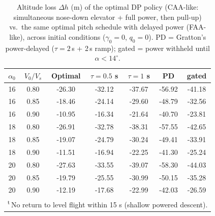 \begin{table}[hbt!]
    \centering
    \caption{Altitude loss $\Delta h$ (m) of the optimal DP policy (CAA-like:
    simultaneous nose-down elevator + full power, then pull-up) vs.\ the same
    optimal pitch schedule with delayed power (FAA-like), across initial
    conditions ($\gamma_0=0$, $q_0=0$). PD = Gratton's power-delayed
    ($\tau=2$\,s + 2\,s ramp); gated = power withheld until $\alpha<14^\circ$.}
    \label{tab:caa_vs_faa}
    \begin{tabular}{ccccccc}
        \hline
        $\alpha_0$ & $V_0/V_s$ & Optimal & $\tau{=}0.5$ s & $\tau{=}1$ s & PD & gated \\
        \hline
        16 & 0.80 & -26.30 & -32.12 & -37.67 & -56.92 & -41.18 \\
        16 & 0.85 & -18.46 & -24.14 & -29.60 & -48.79 & -32.56 \\
        16 & 0.90 & -10.95 & -16.34 & -21.64 & -40.70 & -23.81 \\
        18 & 0.80 & -26.91 & -32.78 & -38.31 & -57.55 & -42.65 \\
        18 & 0.85 & -19.07 & -24.79 & -30.24 & -49.41 & -33.91 \\
        18 & 0.90 & -11.51 & -16.94 & -22.25 & -41.30 & -25.24 \\
        20 & 0.80 & -27.63 & -33.55 & -39.07 & -58.30 & -44.03 \\
        20 & 0.85 & -19.79 & -25.55 & -30.99 & -50.15 & -35.28 \\
        20 & 0.90 & -12.19 & -17.68 & -22.99 & -42.03 & -26.59 \\
        \hline
        \multicolumn{7}{l}{\footnotesize\textsuperscript{t}\,No return to level flight within 15 s (shallow powered descent).}\\
    \end{tabular}
\end{table}
